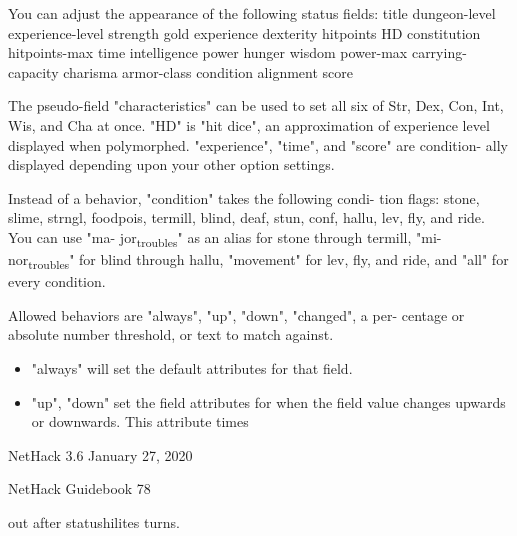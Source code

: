 \documentclass[11pt]{article}
\begin{document}
   You can adjust the appearance of the following status
fields:
      title    dungeon-level  experience-level
     strength     gold      experience
     dexterity    hitpoints      HD
    constitution  hitpoints-max     time
    intelligence    power      hunger
      wisdom    power-max   carrying-capacity
     charisma   armor-class    condition
     alignment              score

The pseudo-field "characteristics" can be used to set all six
of Str, Dex, Con, Int, Wis, and Cha at once.  "HD" is "hit
dice", an approximation of experience level displayed when
polymorphed. "experience", "time", and "score" are condition-
ally displayed depending upon your other option settings.

Instead of a behavior, "condition" takes the following condi-
tion flags: stone, slime, strngl, foodpois, termill, blind,
deaf, stun, conf, hallu, lev, fly, and ride. You can use "ma-
jor\textsubscript{troubles}" as an alias for stone through termill, "mi-
nor\textsubscript{troubles}" for blind through hallu, "movement" for lev, fly,
and ride, and "all" for every condition.

Allowed behaviors are "always", "up", "down", "changed", a per-
centage or absolute number threshold, or text to match against.

\begin{itemize}
\item "always" will set the default attributes for that field.

\item "up", "down" set the field attributes for when the field
value changes upwards or downwards. This attribute times
\end{itemize}


NetHack 3.6                   January 27, 2020





NetHack Guidebook                       78



out after statushilites turns.
\end{document}
